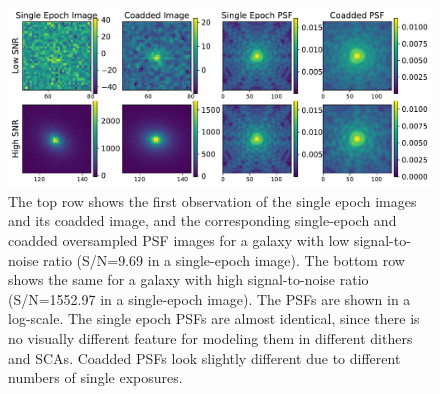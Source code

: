 \documentclass[fleqn,usenatbib]{mnras}
\begin{document}
\begin{figure}
	\includegraphics[width=\textwidth]{lowsnr_highsnr_galaxies.pdf}
    \caption{The top row shows the first observation of the single epoch images and its coadded image, and the corresponding single-epoch and coadded oversampled PSF images for a galaxy with low signal-to-noise ratio (S/N=9.69 in a single-epoch image). The bottom row shows the same for a galaxy with high signal-to-noise ratio (S/N=1552.97 in a single-epoch image). The PSFs are shown in a log-scale. The single epoch PSFs are almost identical, since there is no visually different feature for modeling them in different dithers and SCAs. Coadded PSFs look slightly different due to different numbers of single exposures. }
    \label{fig:singlecoadd}
\end{figure}
\end{document}

